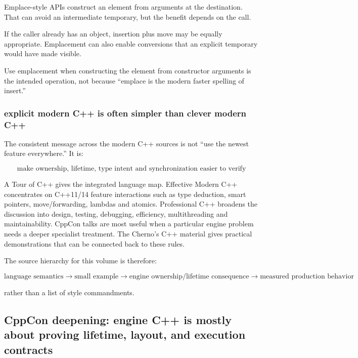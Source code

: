 \hypertarget{01-foundations-i-ch005-emplacement-is-not-automatically-faster-or-safer}{}

Emplace-style APIs construct an element from arguments at the destination. That can avoid an intermediate temporary, but the benefit depends on the call.

If the caller already has an object, insertion plus move may be equally appropriate. Emplacement can also enable conversions that an explicit temporary would have made visible.

Use emplacement when constructing the element from constructor arguments is the intended operation, not because ``emplace is the modern faster spelling of insert.''

\subsubsection{explicit modern C++ is often simpler than clever modern C++}\label{01-foundations-i-ch005-explicit-modern-c-is-often-simpler-than-clever-modern-c}

\hypertarget{01-foundations-i-ch005-explicit-modern-c-is-often-simpler-than-clever-modern-c}{}

The consistent message across the modern C++ sources is not ``use the newest feature everywhere.'' It is:

\[
\boxed{
\text{make ownership, lifetime, type intent and synchronization easier to verify}
}
\]

A Tour of C++ gives the integrated language map. Effective Modern C++ concentrates on C++11/14 feature interactions such as type deduction, smart pointers, move/forwarding, lambdas and atomics. Professional C++ broadens the discussion into design, testing, debugging, efficiency, multithreading and maintainability. CppCon talks are most useful when a particular engine problem needs a deeper specialist treatment. The Cherno's C++ material gives practical demonstrations that can be connected back to these rules.

The source hierarchy for this volume is therefore:

\[
\text{language semantics}
\rightarrow
\text{small example}
\rightarrow
\text{engine ownership/lifetime consequence}
\rightarrow
\text{measured production behavior}
\]

rather than a list of style commandments.

\subsection{CppCon deepening: engine C++ is mostly about proving lifetime, layout, and execution contracts}\label{01-foundations-i-ch005-cppcon-deepening-engine-c-is-mostly-about-proving-lifetime-layout-and-execution-contracts}

